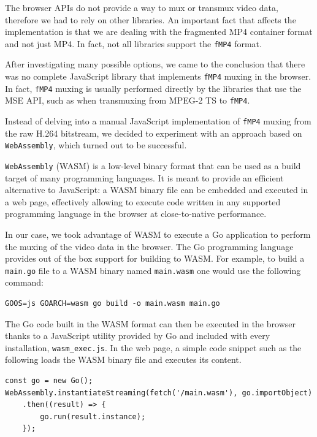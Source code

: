 The browser APIs do not provide a way to mux or transmux video data, therefore we had to rely on other libraries. An important fact that affects the implementation is that we are dealing with the fragmented MP4 container format and not just MP4. In fact, not all libraries support the \texttt{fMP4} format.

After investigating many possible options, we came to the conclusion that there was no complete JavaScript library that implements \texttt{fMP4} muxing in the browser. In fact, \texttt{fMP4} muxing is usually performed directly by the libraries that use the MSE API, such as \hlsjs{} when transmuxing from MPEG-2 TS to \texttt{fMP4}.

Instead of delving into a manual JavaScript implementation of \texttt{fMP4} muxing from the raw H.264 bitstream, we decided to experiment with an approach based on \texttt{WebAssembly}, which turned out to be successful.

\texttt{WebAssembly} (WASM) is a low-level binary format that can be used as a build target of many programming languages. It is meant to provide an efficient alternative to JavaScript: a WASM binary file can be embedded and executed in a web page, effectively allowing to execute code written in any supported programming language in the browser at close-to-native performance.

In our case, we took advantage of WASM to execute a Go application to perform the muxing of the video data in the browser. The Go programming language provides out of the box support for building to WASM. For example, to build a \texttt{main.go} file to a WASM binary named \texttt{main.wasm} one would use the following command:

\begin{verbatim}
GOOS=js GOARCH=wasm go build -o main.wasm main.go
\end{verbatim}

The Go code built in the WASM format can then be executed in the browser thanks to a JavaScript utility provided by Go and included with every installation, \texttt{wasm\_exec.js}. In the web page, a simple code snippet such as the following loads the WASM binary file and executes its content.

\begin{verbatim}
const go = new Go();
WebAssembly.instantiateStreaming(fetch('/main.wasm'), go.importObject)
    .then((result) => {
        go.run(result.instance);
    });
\end{verbatim}

